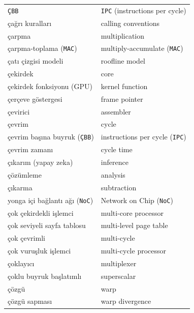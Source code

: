 {\begin{longtable}{@{}p{7.6cm}p{7.6cm}@{}}
\texttt{ÇBB} & \texttt{IPC} (instructions per cycle) \\
çağrı kuralları & calling conventions \\
çarpma & multiplication \\
çarpma-toplama (\texttt{MAC}) & multiply-accumulate (\texttt{MAC}) \\
çatı çizgisi modeli & roofline model \\
çekirdek & core \\
çekirdek fonksiyonu (GPU) & kernel function \\
çerçeve göstergesi & frame pointer \\
çevirici & assembler \\
çevrim & cycle \\
çevrim başına buyruk (\texttt{ÇBB}) & instructions per cycle (\texttt{IPC}) \\
çevrim zamanı & cycle time \\
çıkarım (yapay zeka) & inference \\
çözümleme & analysis \\
çıkarma & subtraction \\
yonga içi bağlantı ağı (\texttt{NoC}) & Network on Chip (\texttt{NoC}) \\
çok çekirdekli işlemci & multi-core processor \\
çok seviyeli sayfa tablosu & multi-level page table \\
çok çevrimli & multi-cycle \\
çok vuruşluk işlemci & multi-cycle processor \\
çoklayıcı & multiplexer \\
çoklu buyruk başlatımlı & superscalar \\
çözgü & warp \\
çözgü sapması & warp divergence \\


\end{longtable}}
